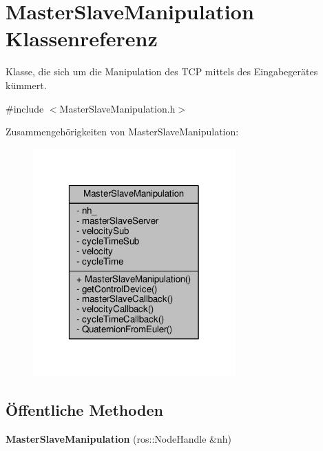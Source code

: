 \hypertarget{classMasterSlaveManipulation}{\section{Master\-Slave\-Manipulation Klassenreferenz}
\label{classMasterSlaveManipulation}
}


Klasse, die sich um die Manipulation des T\-C\-P mittels des Eingabegerätes kümmert.  




{\ttfamily \#include $<$Master\-Slave\-Manipulation.\-h$>$}



Zusammengehörigkeiten von Master\-Slave\-Manipulation\-:
\nopagebreak
\begin{figure}[H]
\begin{center}
\leavevmode
\includegraphics[width=220pt]{classMasterSlaveManipulation__coll__graph}
\end{center}
\end{figure}
\subsection*{Öffentliche Methoden}
\begin{DoxyCompactItemize}
\item 
\hypertarget{classMasterSlaveManipulation_a7f517d59d59a8d27d905b36edc604715}{{\bfseries Master\-Slave\-Manipulation} (ros\-::\-Node\-Handle \&nh)}\label{classMasterSlaveManipulation_a7f517d59d59a8d27d905b36edc604715}

\end{DoxyCompactItemize}
